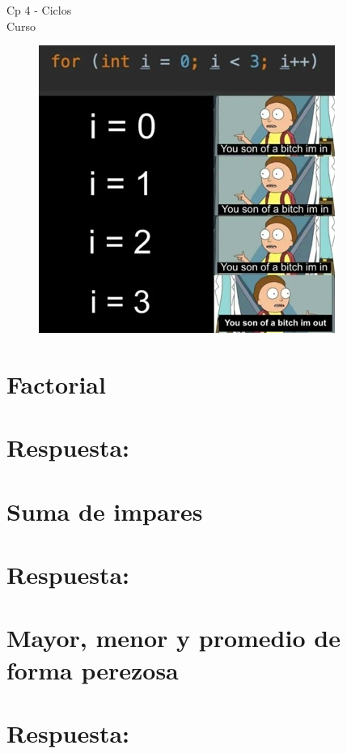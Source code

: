 \begin{center}
    \begin{large}
    Cp 4 - Ciclos\\
    Curso \academicyear\\
    \end{large}
    \begin{figure}[h]
    	\centering
    	\includegraphics[width=0.5\linewidth]{cp4/loops.jpg}
    \end{figure}
\end{center}

\section{Factorial}


\ifshowanswers
\section*{Respuesta:}

\fi

\section{Suma de impares}


\ifshowanswers
\section*{Respuesta:}

\fi

\section{Mayor, menor y promedio de forma perezosa}


\ifshowanswers
\section*{Respuesta:}

\fi

